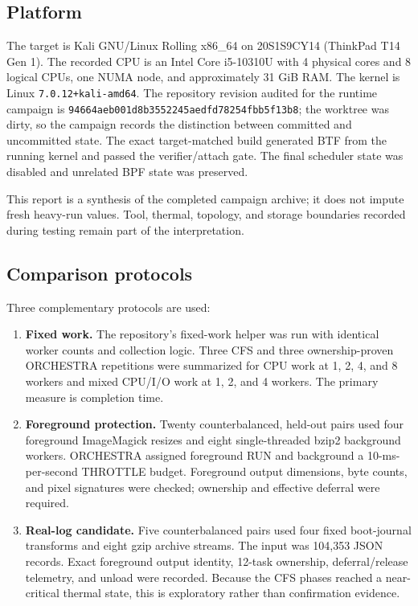 \documentclass[10pt,letterpaper,twocolumn]{article}
\newcommand{\hostid}{20S1S9CY14 (ThinkPad T14 Gen 1)}
\begin{document}
\subsection{Platform}

The target is Kali GNU/Linux Rolling x86\_64 on \hostid. The recorded CPU is an Intel Core i5-10310U with 4 physical cores and 8 logical CPUs, one NUMA node, and approximately 31 GiB RAM. The kernel is Linux \texttt{7.0.12+kali-amd64}. The repository revision audited for the runtime campaign is \texttt{94664aeb001d8b3552245aedfd78254fbb5f13b8}; the worktree was dirty, so the campaign records the distinction between committed and uncommitted state. The exact target-matched build generated BTF from the running kernel and passed the verifier/attach gate. The final scheduler state was disabled and unrelated BPF state was preserved.

This report is a synthesis of the completed campaign archive; it does not
impute fresh heavy-run values. Tool, thermal, topology, and storage boundaries
recorded during testing remain part of the interpretation.

\subsection{Comparison protocols}

Three complementary protocols are used:

\begin{enumerate}
  \item \textbf{Fixed work.} The repository's fixed-work helper was run with identical worker counts and collection logic. Three CFS and three ownership-proven ORCHESTRA repetitions were summarized for CPU work at 1, 2, 4, and 8 workers and mixed CPU/I/O work at 1, 2, and 4 workers. The primary measure is completion time.
  \item \textbf{Foreground protection.} Twenty counterbalanced, held-out pairs used four foreground ImageMagick resizes and eight single-threaded bzip2 background workers. ORCHESTRA assigned foreground RUN and background a 10-ms-per-second THROTTLE budget. Foreground output dimensions, byte counts, and pixel signatures were checked; ownership and effective deferral were required.
  \item \textbf{Real-log candidate.} Five counterbalanced pairs used four fixed boot-journal transforms and eight gzip archive streams. The input was 104,353 JSON records. Exact foreground output identity, 12-task ownership, deferral/release telemetry, and unload were recorded. Because the CFS phases reached a near-critical thermal state, this is exploratory rather than confirmation evidence.
\end{enumerate}
\end{document}

